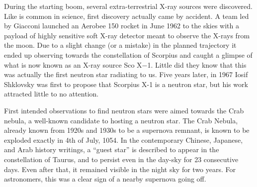 

During the starting boom, several extra-terrestrial X-ray sources were discovered.
Like is common in science, first discovery actually came by accident.
A team led by Giacconi launched an Aerobee 150 rocket in June 1962 to the skies with a payload of highly sensitive soft X-ray detector meant to observe the X-rays from the moon.
Due to a slight change (or a mistake) in the planned trajectory it ended up observing towards the constellation of Scorpius and caught a glimpse of what is now known as an X-ray source Sco X$-$1.
Little did they know that this was actually the first neutron star radiating to us.
Five years later, in 1967 Iosif Shklovsky was first to propose that Scorpius X-1 is a neutron star\cite{Shklovsky67}, but his work attracted little to no attention.

First intended observations to find neutron stars were aimed towards the Crab nebula, a well-known candidate to hosting a neutron star.
The Crab Nebula, already known from 1920s and 1930s to be a supernova remnant, is known to be exploded exactly in 4th of July, 1054.\cite{Oort, Lundmark21, Mayall39, HistSupernovas}
In the contemporary Chinese, Japanese, and Arab history writings, a ``guest star'' is described to appear in the constellation of Taurus, and to persist even in the day-sky for 23 consecutive days.
Even after that, it remained visible in the night sky for two years.
For astronomers, this was a clear sign of a nearby supernova going off.



